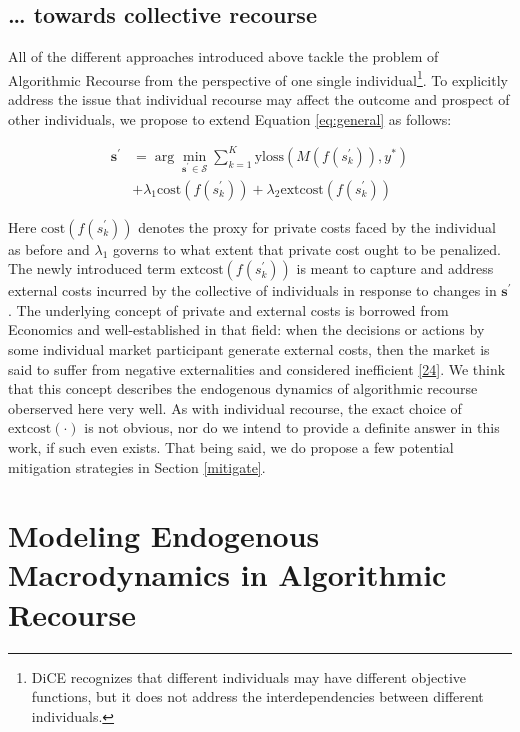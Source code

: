 \documentclass[conference,final,]{IEEEtran}
\begin{document}
\hypertarget{towards-collective-recourse}{%
\subsection{\ldots{} towards collective recourse}\label{towards-collective-recourse}}

All of the different approaches introduced above tackle the problem of Algorithmic Recourse from the perspective of one single individual\footnote{DiCE recognizes that different individuals may have different objective functions, but it does not address the interdependencies between different individuals.}. To explicitly address the issue that individual recourse may affect the outcome and prospect of other individuals, we propose to extend Equation \eqref{eq:general} as follows:

\begin{equation}
\begin{aligned}
\mathbf{s}^\prime &= \arg \min_{\mathbf{s}^\prime \in \mathcal{S}}  \sum_{k=1}^{K} {\text{yloss}(M(f(s_k^\prime)),y^*)} \\ &+ \lambda_1 {\text{cost}(f(s_k^\prime))} + \lambda_2 {\text{extcost}(f(s_k^\prime))}  \label{eq:collective}
\end{aligned} 
\end{equation}

Here \(\text{cost}(f(s_k^\prime))\) denotes the proxy for private costs faced by the individual as before and \(\lambda_1\) governs to what extent that private cost ought to be penalized. The newly introduced term \(\text{extcost}(f(s_k^\prime))\) is meant to capture and address external costs incurred by the collective of individuals in response to changes in \(\mathbf{s}^\prime\). The underlying concept of private and external costs is borrowed from Economics and well-established in that field: when the decisions or actions by some individual market participant generate external costs, then the market is said to suffer from negative externalities and considered inefficient \protect\hyperlink{ref-pindyck2014microeconomics}{{[}24{]}}. We think that this concept describes the endogenous dynamics of algorithmic recourse oberserved here very well. As with individual recourse, the exact choice of \(\text{extcost}(\cdot)\) is not obvious, nor do we intend to provide a definite answer in this work, if such even exists. That being said, we do propose a few potential mitigation strategies in Section \ref{mitigate}.

\hypertarget{method-2}{%
\section{Modeling Endogenous Macrodynamics in Algorithmic Recourse}\label{method-2}}
\end{document}
